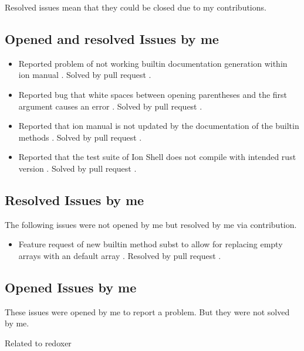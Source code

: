 Resolved issues mean that they could be closed due to my contributions.

\subsection{Opened and resolved Issues by me}

\begin{itemize}
	\item Reported problem of not working builtin documentation generation within ion manual \cite{issue_builtin_generation}. Solved by pull request \cite{pr_man_history_included_ion_manual}.
	\item Reported bug that white spaces between opening parentheses and the first argument causes an error \cite{issue_spaces_between_opening_parentheses}. Solved by pull request \cite{issue_spaces_between_opening_parentheses}.
	\item Reported that ion manual is not updated by the documentation of the builtin methods \cite{issue_ion_manual_not_updated}. Solved by pull request \cite{pr_subst_method}.
	\item Reported that the test suite of Ion Shell does not compile with intended rust version \cite{issue_bug_test_not_compile}. Solved by pull request \cite{pr_conf_partial_ci_fix}.
\end{itemize}

\subsection{Resolved Issues by me}

The following issues were not opened by me but resolved by me via contribution.

\begin{itemize}
	\item Feature request of new builtin method subst to allow for replacing empty arrays with an default array \cite{issue_subst_request}. Resolved by pull request \cite{pr_subst_method}.
\end{itemize}

\subsection{Opened Issues by me}

These issues were opened by me to report a problem. But they were not solved by me.

Related to \gls{redoxer}

